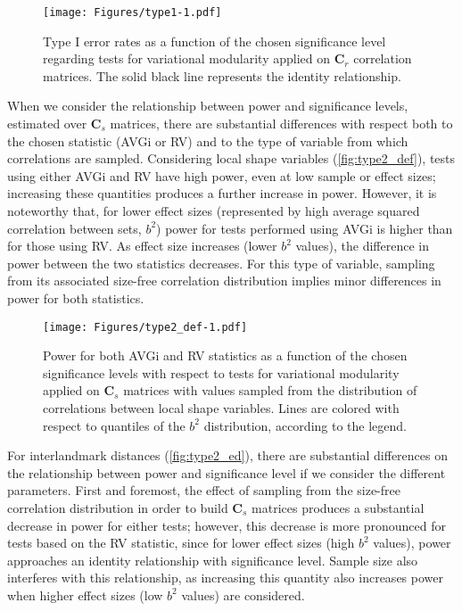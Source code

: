 \documentclass[11pt,twoside]{report}
\begin{document}
\begin{figure}[htbp]
\centering
\texttt{[image: Figures/type1-1.pdf]}
\caption{Type I error rates as a function of the chosen significance
level regarding tests for variational modularity applied on
$\mathbf{C}_r$ correlation matrices. The solid black line represents the
identity relationship. \label{fig:type1}}
\end{figure}

When we consider the relationship between power and significance levels,
estimated over $\mathbf{C}_s$ matrices, there are substantial
differences with respect both to the chosen statistic (AVGi or RV) and
to the type of variable from which correlations are sampled. Considering
local shape variables (\autoref{fig:type2_def}), tests using either AVGi
and RV have high power, even at low sample or effect sizes; increasing
these quantities produces a further increase in power. However, it is
noteworthy that, for lower effect sizes (represented by high average
squared correlation between sets, $b^2$) power for tests performed using
AVGi is higher than for those using RV. As effect size increases (lower
$b^2$ values), the difference in power between the two statistics
decreases. For this type of variable, sampling from its associated
size-free correlation distribution implies minor differences in power
for both statistics.

\begin{figure}[htbp]
\centering
\texttt{[image: Figures/type2\_def-1.pdf]}
\caption{Power for both AVGi and RV statistics as a function of the
chosen significance levels with respect to tests for variational
modularity applied on $\mathbf{C}_s$ matrices with values sampled from
the distribution of correlations between local shape variables. Lines
are colored with respect to quantiles of the $b^2$ distribution,
according to the legend. \label{fig:type2_def}}
\end{figure}

For interlandmark distances (\autoref{fig:type2_ed}), there are
substantial differences on the relationship between power and
significance level if we consider the different parameters. First and
foremost, the effect of sampling from the size-free correlation
distribution in order to build $\mathbf{C}_s$ matrices produces a
substantial decrease in power for either tests; however, this decrease
is more pronounced for tests based on the RV statistic, since for lower
effect sizes (high $b^2$ values), power approaches an identity
relationship with significance level. Sample size also interferes with
this relationship, as increasing this quantity also increases power when
higher effect sizes (low $b^2$ values) are considered.
\end{document}
